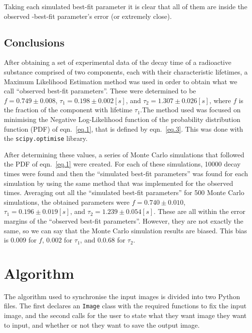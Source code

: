 \documentclass[a4paper,12pt]{article}
\begin{document}
Taking each simulated best-fit parameter it is clear that all of them are inside the observed -best-fit parameter's error (or extremely close). 

\subsection{Conclusions}

After obtaining a set of experimental data of the decay time of a radioactive substance comprised of two components, each with their characteristic lifetimes, a Maximum Likelihood Estimation method was used in order to obtain what we call ``observed best-fit parameters''. These were determined to be $f=0.749 \pm 0.008$, $\tau_1=0.198 \pm 0.002 [s]$, and $\tau_2=1.307 \pm 0.026 [s]$, where $f$ is the fraction of the component with lifetime $\tau_1$.The method used was focused on minimising the Negative Log-Likelihood function of the probability distribution function (PDF) of eqn.~\ref{eq.1}, that is defined by eqn.~\ref{eq.3}. This was done with the \texttt{scipy.optimise} library.

After determining these values, a series of Monte Carlo simulations that followed the PDF of eqn.~\ref{eq.1} were created. For each of these simulations, 10000 decay times were found and then the ``simulated best-fit parameters'' was found for each simulation by using the same method that was implemented for the observed times. Averaging out all the ``simulated best-fit parameters'' for 500 Monte Carlo simulations, the obtained parameters were $f=0.740 \pm 0.010$, $\tau_1=0.196 \pm 0.019 [s]$, and $\tau_2=1.239 \pm 0.054 [s]$. These are all within the error margins of the ``observed best-fit parameters''. However, they are not exactly the same, so we can say that the Monte Carlo simulation results are biased. This bias is $0.009$ for $f$, $0.002$ for $\tau_1$, and $0.0.68$ for $\tau_2$. 

\newpage

\appendix

\section{Algorithm}

The algorithm used to synchronise the input images is divided into two Python files. The first declares an \texttt{Image} class with the required functions to fix the input image, and the second calls for the user to state what they want image they want to input, and whether or not they want to save the output image. 
\end{document}
